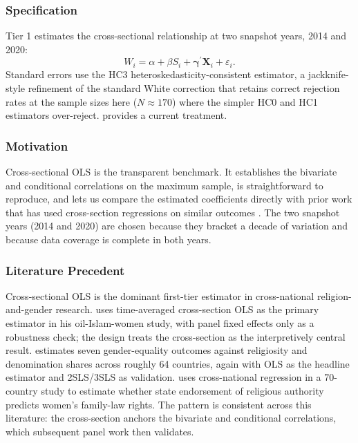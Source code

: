 \documentclass[12pt,a4paper]{article}
\begin{document}
\subsubsection{Specification}

Tier 1 estimates the cross-sectional relationship at two snapshot years, 2014 and 2020:
\begin{equation}
W_i = \alpha + \beta S_i + \boldsymbol{\gamma}^{\prime} \mathbf{X}_i + \varepsilon_i.
\end{equation}
Standard errors use the HC3 heteroskedasticity-consistent estimator, a jackknife-style refinement of the standard White correction that retains correct rejection rates at the sample sizes here ($N \approx 170$) where the simpler HC0 and HC1 estimators over-reject. \citet{CameronMiller2015} provides a current treatment.

\subsubsection{Motivation}

Cross-sectional OLS is the transparent benchmark. It establishes the bivariate and conditional correlations on the maximum sample, is straightforward to reproduce, and lets us compare the estimated coefficients directly with prior work that has used cross-section regressions on similar outcomes \citep{Ross2008, Seguino2011, HtunWeldon2015}. The two snapshot years (2014 and 2020) are chosen because they bracket a decade of variation and because data coverage is complete in both years.

\subsubsection{Literature Precedent}

Cross-sectional OLS is the dominant first-tier estimator in cross-national religion-and-gender research. \citet{Ross2008} uses time-averaged cross-section OLS as the primary estimator in his oil-Islam-women study, with panel fixed effects only as a robustness check; the design treats the cross-section as the interpretively central result. \citet{Seguino2011} estimates seven gender-equality outcomes against religiosity and denomination shares across roughly 64 countries, again with OLS as the headline estimator and 2SLS/3SLS as validation. \citet{HtunWeldon2015} uses cross-national regression in a 70-country study to estimate whether state endorsement of religious authority predicts women's family-law rights. The pattern is consistent across this literature: the cross-section anchors the bivariate and conditional correlations, which subsequent panel work then validates.
\end{document}
